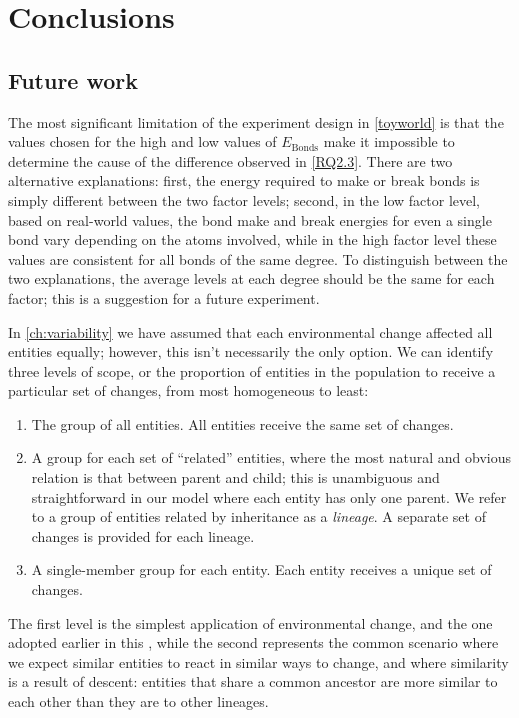 \chapter{Conclusions}\label{thesis-conclusions}

\section{Future work}
The most significant limitation of the experiment design in \cref{toyworld} is that the values chosen for the high and low values of $E_\mathrm{Bonds}$ make it impossible to determine the cause of the difference observed in \cref{RQ2.3}. There are two alternative explanations: first, the energy required to make or break bonds is simply different between the two factor levels; second, in the low factor level, based on real-world values, the bond make and break energies for even a single bond vary depending on the atoms involved, while in the high factor level these values are consistent for all bonds of the same degree. To distinguish between the two explanations, the average levels at each degree should be the same for each factor; this is a suggestion for a future experiment.

In \cref{ch:variability} we have assumed that each environmental change affected all entities equally; however, this isn't necessarily the only option. We can identify three levels of scope, or the proportion of entities in the population to receive a particular set of changes, from most homogeneous to least:

\begin{enumerate}
	\item The group of all entities. All entities receive the same set of changes.
	\item A group for each set of ``related'' entities, where the most natural and obvious relation is that between parent and child; this is unambiguous and straightforward in our model where each entity has only one parent. We refer to a group of entities related by inheritance as a \emph{lineage}. A separate set of changes is provided for each lineage.
	\item A single-member group for each entity. Each entity receives a unique set of changes.
\end{enumerate}

The first level is the simplest application of environmental change, and the one adopted earlier in this , while the second represents the common scenario where we expect similar entities to react in similar ways to change, and where similarity is a result of descent: entities that share a common ancestor are more similar to each other than they are to other lineages. 

